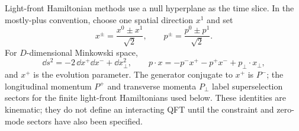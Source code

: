Light-front Hamiltonian methods use a null hyperplane as the time slice.  In
the mostly-plus convention, choose one spatial direction \(x^1\) and set
\begin{equation}
  x^\pm=\frac{x^0\pm x^1}{\sqrt2},
  \qquad
  p^\pm=\frac{p^0\pm p^1}{\sqrt2}.
  \label{eq:general-light-front-coordinates}
\end{equation}
For \(D\)-dimensional Minkowski space,
\begin{equation}
  \dd s^2=-2\,\dd x^+\dd x^-+\dd x_\perp^2,
  \qquad
  p\cdot x=-p^-x^+-p^+x^-+p_\perp\cdot x_\perp,
  \label{eq:general-light-front-metric}
\end{equation}
and \(x^+\) is the evolution parameter.  The generator conjugate to \(x^+\)
is \(P^-\); the longitudinal momentum \(P^+\) and transverse momenta
\(P_\perp\) label superselection sectors for the finite light-front
Hamiltonians used below.  These identities are kinematic; they do not define
an interacting QFT until the constraint and zero-mode sectors have also been
specified.

